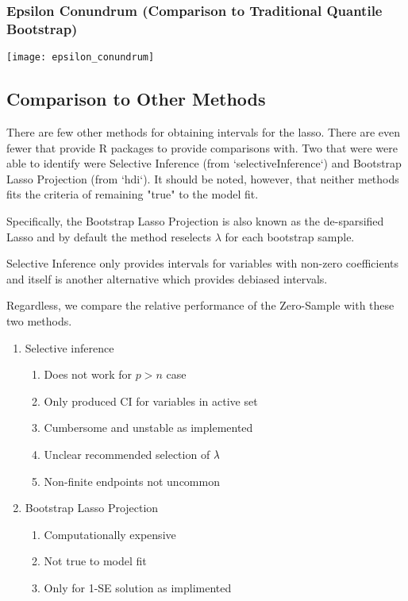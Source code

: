 
\subsubsection{Epsilon Conundrum (Comparison to Traditional Quantile Bootstrap)}

\texttt{[image: epsilon\_conundrum]}

\subsection{Comparison to Other Methods}

There are few other methods for obtaining intervals for the lasso. There are even fewer that provide R packages to provide comparisons with. Two that were were able to identify were Selective Inference (from `selectiveInference`) and Bootstrap Lasso Projection (from `hdi`). It should be noted, however, that neither methods fits the criteria of remaining "true" to the model fit.

Specifically, the Bootstrap Lasso Projection is also known as the de-sparsified Lasso and by default the method reselects $\lambda$ for each bootstrap sample.

Selective Inference only provides intervals for variables with non-zero coefficients and itself is another alternative which provides debiased intervals.

Regardless, we compare the relative performance of the Zero-Sample with these two methods.

\begin{enumerate}
\item Selective inference
\begin{enumerate}
\item Does not work for $p > n$ case
\item Only produced CI for variables in active set
\item Cumbersome and unstable as implemented
\item Unclear recommended selection of $\lambda$
\item Non-finite endpoints not uncommon
\end{enumerate}
\item{Bootstrap Lasso Projection}
\begin{enumerate}
\item Computationally expensive
\item Not true to model fit
\item Only for 1-SE solution as implimented
\end{enumerate}
\end{enumerate}

